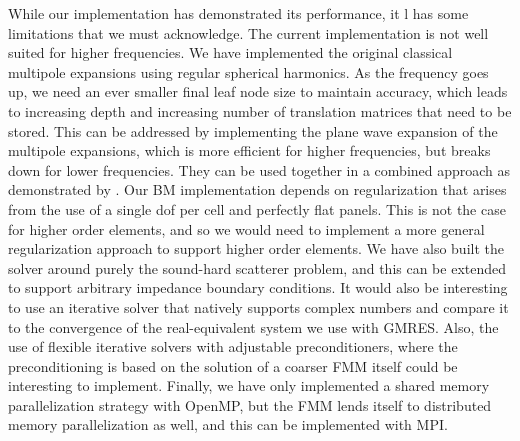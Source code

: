 While our implementation has demonstrated its performance, it l has some limitations that we must acknowledge. The current implementation is not well suited for higher frequencies. We have implemented the original classical multipole expansions using regular spherical harmonics. As the frequency goes up, we need an ever smaller final leaf node size to maintain accuracy, which leads to increasing depth and increasing number of translation matrices that need to be stored. This can be addressed by implementing the plane wave expansion of the multipole expansions, which is more efficient for higher frequencies, but breaks down for lower frequencies. They can be used together in a combined approach as demonstrated by \cite{gumerovbroadbandfastmultipole2009}. 
Our \ac{BM} implementation depends on regularization that arises from the use of a single dof per cell and perfectly flat panels. This is not the case for higher order elements, and so we would need to implement a more general regularization approach to support higher order elements. We have also built the solver around purely the sound-hard scatterer problem, and this can be extended to support arbitrary impedance boundary conditions. It would also be interesting to use an iterative solver that natively supports complex numbers and compare it to the convergence of the real-equivalent system we use with \ac{GMRES}. Also, the use of flexible iterative solvers with adjustable preconditioners, where the preconditioning is based on the solution of a coarser \ac{FMM} itself could be interesting to implement. Finally, we have only implemented a shared memory parallelization strategy with OpenMP, but the \ac{FMM} lends itself to distributed memory parallelization as well, and this can be implemented with MPI.
